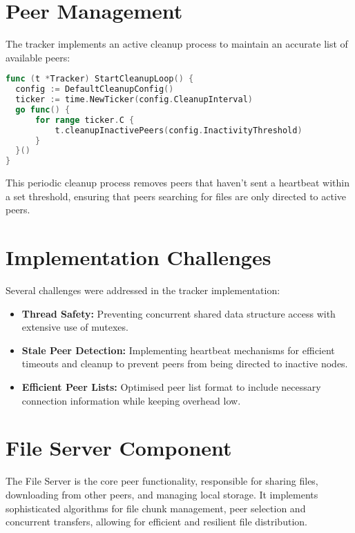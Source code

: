 \documentclass[12pt,a4paper]{report}
\begin{document}
\section*{Peer Management}
The tracker implements an active cleanup process to maintain an accurate list of available peers:

\begin{lstlisting}[language=Go, caption=Peer Cleanup]
func (t *Tracker) StartCleanupLoop() {
  config := DefaultCleanupConfig()
  ticker := time.NewTicker(config.CleanupInterval)
  go func() {
      for range ticker.C {
          t.cleanupInactivePeers(config.InactivityThreshold)
      }
  }()
}
\end{lstlisting}

This periodic cleanup process removes peers that haven't sent a heartbeat within a set threshold, ensuring that peers searching for files are only directed to active peers.

\section*{Implementation Challenges}
Several challenges were addressed in the tracker implementation:
\begin{itemize}
	\item \textbf{Thread Safety:} Preventing concurrent shared data structure access with extensive use of mutexes.
	\item \textbf{Stale Peer Detection:} Implementing heartbeat mechanisms for efficient timeouts and cleanup to prevent peers from being directed to inactive nodes.
	\item \textbf{Efficient Peer Lists:} Optimised peer list format to include necessary connection information while keeping overhead low.
\end{itemize}

\section{File Server Component}

The File Server is the core peer functionality, responsible for sharing files, downloading from other peers, and managing local storage. It implements sophisticated algorithms for file chunk management, peer selection and concurrent transfers, allowing for efficient and resilient file distribution.
\end{document}
